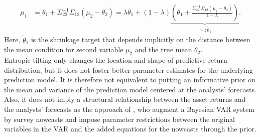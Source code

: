 \begin{align}
	\mu_1&=\theta_1+\Sigma_{22}^{-1}\Sigma_{12}(\mu_2-\theta_2)=\lambda\theta_1+(1-\lambda)\underbrace{\left(\theta_1+\frac{\Sigma_{22}^{-1}\Sigma_{12}(\mu_2-\theta_2)}{1-\lambda}\right)}_{=:\tilde{\theta}_1}.
\end{align}
Here, $\tilde{\theta}_1$ is the shrinkage target that depends implicitly on the distance between the mean condition for second variable $\mu_2$ and the true mean $\theta_2$.\\
%
\indent Entropic tilting only changes the location and shape of predictive return distribution, but it does not foster better parameter estimates for the underlying prediction model. It is therefore not equivalent to putting an informative prior on the mean and variance of the prediction model centered at the analysts' forecasts. Also, it does not imply a structural relationship between the asset returns and the analysts' forecasts as the approach of \cite{frey2015}, who augment a Bayesian VAR system by survey nowcasts and impose parameter restrictions between the original variables in the VAR and the added equations for the nowcasts through the prior. 




